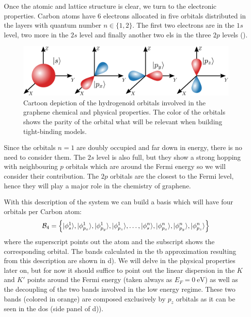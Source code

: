 Once the atomic and lattice structure is clear, we turn to the electronic properties. Carbon atoms have 6 electrons allocated in five orbitals distributed in the layers with quantum number $n\in\{1,2\}$.
The first two electrons are in the $1s$ level, two more in the $2s$ level and finally another two \acp{el} in the three $2p$ levels ().
\begin{figure}[!ht]
\centering
\includegraphics{graphene/figures/orbitals.pdf}
\vspace{-5pt}
\caption{Cartoon depiction of the hydrogenoid orbitals involved in the graphene chemical and physical properties. The color of the orbitals shows the parity of the orbital what will be relevant when building tight-binding models.}
\label{orbitals}
\end{figure}
Since the orbitals $n=1$ are doubly occupied and far down in energy, there is no need to consider them. The $2s$ level is also full, but they show a strong hopping with neighbouring $p$ orbitals which are around the Fermi energy so we will consider their contribution. The $2p$ orbitals are the closest to the Fermi level, hence they will play a major role in the chemistry of graphene.
\medbreak

With this description of the system we can build a basis which will have four orbitals per Carbon atom:
\begin{equation}
  \mathcal{B}_4 = \left\{
  |\phi^1_{s}\rangle,|\phi^1_{p_x}\rangle,|\phi^1_{p_y}\rangle,|\phi^1_{p_z}\rangle,
  \dots,
  |\phi^n_{s}\rangle,|\phi^n_{p_x}\rangle,|\phi^n_{p_y}\rangle,|\phi^n_{p_z}\rangle
  \right\}
\label{basis4}
\end{equation}
where the superscript points out the atom and the subscript shows the corresponding orbital. The bands calculated in the \ac{tb} approximation resulting from this description are shown in d). We will delve in the physical properties later on, but for now it should suffice to point out the linear dispersion in the $K$ and $K'$ points around the Fermi energy (taken always as $E_F=\SI{0}{\eV}$) as well as the decoupling of the two bands involved in the low energy regime. These two bands (colored in orange) are composed exclusively by $p_z$ orbitals as it can be seen in the \ac{dos} (side panel of d)).
\smallskip


